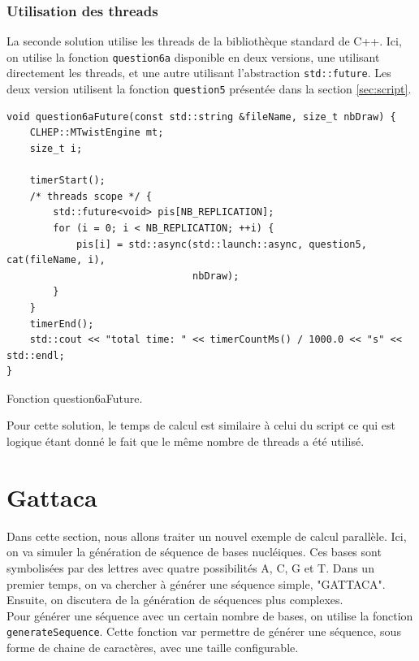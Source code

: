 \documentclass[a4paper]{article}
\begin{document}
\subsubsection{Utilisation des threads}

La seconde solution utilise les threads de la bibliothèque standard de C++. Ici,
on utilise la fonction \lstinline{question6a} disponible en deux versions, une
utilisant directement les threads, et une autre utilisant l'abstraction
\lstinline{std::future}. Les deux version utilisent la fonction
\lstinline{question5} présentée dans la section \ref{sec:script}.

\begin{listing}[ht!]
\begin{verbatim}
void question6aFuture(const std::string &fileName, size_t nbDraw) {
    CLHEP::MTwistEngine mt;
    size_t i;

    timerStart();
    /* threads scope */ {
        std::future<void> pis[NB_REPLICATION];
        for (i = 0; i < NB_REPLICATION; ++i) {
            pis[i] = std::async(std::launch::async, question5, cat(fileName, i),
                                nbDraw);
        }
    }
    timerEnd();
    std::cout << "total time: " << timerCountMs() / 1000.0 << "s" << std::endl;
}
\end{verbatim}
\caption{Fonction question6aFuture.}
\label{fn-q6}
\end{listing}

Pour cette solution, le temps de calcul est similaire à celui du script ce qui
est logique étant donné le fait que le même nombre de threads a été utilisé.

\section{Gattaca}

Dans cette section, nous allons traiter un nouvel exemple de calcul parallèle.
Ici, on va simuler la génération de séquence de bases nucléiques. Ces bases sont
symbolisées par des lettres avec quatre possibilités A, C, G et T. Dans un
premier temps, on va chercher à générer une séquence simple, "GATTACA". Ensuite,
on discutera de la génération de séquences plus complexes.\\

Pour générer une séquence avec un certain nombre de bases, on utilise la
fonction \lstinline{generateSequence}. Cette fonction var permettre de générer
une séquence, sous forme de chaine de caractères, avec une taille configurable.
\end{document}
